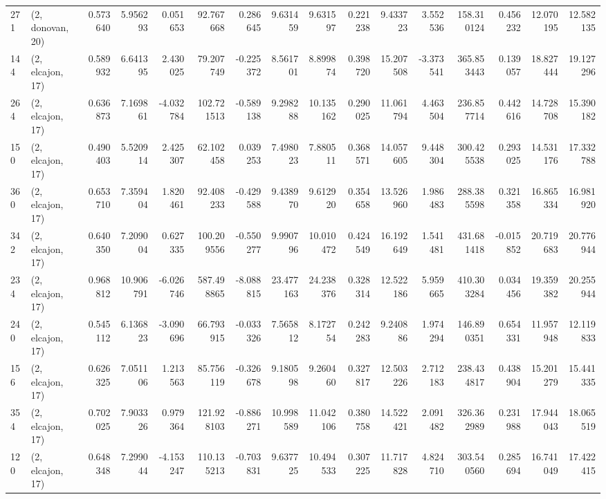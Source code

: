 \begin{tabular}{llrrrrrrrrrrrrrr}
271 &  (2, donovan, 20) &   0.573640 &   5.956293 &   0.051653 &    92.767668 &   0.286645 &   9.631459 &   9.631597 &  0.221238 &   9.433723 &   3.552536 &   158.310124 &  0.456232 &  12.070195 &  12.582135 \\
144 &  (2, elcajon, 17) &   0.589932 &   6.641395 &   2.430025 &    79.207749 &  -0.225372 &   8.561701 &   8.899874 &  0.398720 &  15.207508 &  -3.373541 &   365.853443 &  0.139057 &  18.827444 &  19.127296 \\
264 &  (2, elcajon, 17) &   0.636873 &   7.169861 &  -4.032784 &   102.721513 &  -0.589138 &   9.298288 &  10.135162 &  0.290025 &  11.061794 &   4.463504 &   236.857714 &  0.442616 &  14.728708 &  15.390182 \\
150 &  (2, elcajon, 17) &   0.490403 &   5.520914 &   2.425307 &    62.102458 &   0.039253 &   7.498023 &   7.880511 &  0.368571 &  14.057605 &   9.448304 &   300.425538 &  0.293025 &  14.531176 &  17.332788 \\
360 &  (2, elcajon, 17) &   0.653710 &   7.359404 &   1.820461 &    92.408233 &  -0.429588 &   9.438970 &   9.612920 &  0.354658 &  13.526960 &   1.986483 &   288.385598 &  0.321358 &  16.865334 &  16.981920 \\
342 &  (2, elcajon, 17) &   0.640350 &   7.209004 &   0.627335 &   100.209556 &  -0.550277 &   9.990796 &  10.010472 &  0.424549 &  16.192649 &   1.541481 &   431.681418 & -0.015852 &  20.719683 &  20.776944 \\
234 &  (2, elcajon, 17) &   0.968812 &  10.906791 &  -6.026746 &   587.498865 &  -8.088815 &  23.477163 &  24.238376 &  0.328314 &  12.522186 &   5.959665 &   410.303284 &  0.034456 &  19.359382 &  20.255944 \\
240 &  (2, elcajon, 17) &   0.545112 &   6.136823 &  -3.090696 &    66.793915 &  -0.033326 &   7.565812 &   8.172754 &  0.242283 &   9.240886 &   1.974294 &   146.890351 &  0.654331 &  11.957948 &  12.119833 \\
156 &  (2, elcajon, 17) &   0.626325 &   7.051106 &   1.213563 &    85.756119 &  -0.326678 &   9.180598 &   9.260460 &  0.327817 &  12.503226 &   2.712183 &   238.434817 &  0.438904 &  15.201279 &  15.441335 \\
354 &  (2, elcajon, 17) &   0.702025 &   7.903326 &   0.979364 &   121.928103 &  -0.886271 &  10.998589 &  11.042106 &  0.380758 &  14.522421 &   2.091482 &   326.362989 &  0.231988 &  17.944043 &  18.065519 \\
120 &  (2, elcajon, 17) &   0.648348 &   7.299044 &  -4.153247 &   110.135213 &  -0.703831 &   9.637725 &  10.494533 &  0.307225 &  11.717828 &   4.824710 &   303.540560 &  0.285694 &  16.741049 &  17.422415 \\

\end{tabular}
